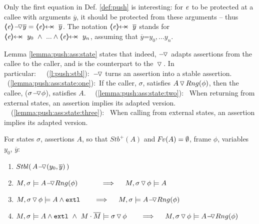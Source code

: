 Only the first equation in  Def.  \ref{def:push}  is interesting: for $\re$ to be {protected at  a} callee with arguments $\overline y$, it should be protected from   %
these arguments -- thus
  $\PushAS y {\inside \re} = \protectedFrom {\re} {\overline {y}}$. 
The notation $\protectedFrom {\re} {\overline {y}}$   stands for $\protectedFrom \re {y_0}\  \wedge\  ...  \wedge \protectedFrom \re {y_n}$, assuming that $\overline y$=${y_0, ... y_n}$.

Lemma \ref{lemma:push:ass:state}  states that   
indeed, $\pushSymbolInText$ adapts assertions from the callee to the caller, and is the counterpart to the  
$\pushSymbol$.
{In particular:\ \ 
 \ (\ref{l:push:stbl}):\    $\pushSymbolInText$ turns an assertion into a stable assertion.
\ (\ref{lemma:push:ass:state:one}):\ If the caller,   $\sigma$,  satisfies  $\PushSLong  {Rng(\phi)} {A}$, then  the callee,   ($\PushASLong {\phi} {\sigma}$), satisfies $A$.
\ \ (\ref{lemma:push:ass:state:two}): \ When returning from external states,  an assertion implies its adapted version.
 \ \ (\ref{lemma:push:ass:state:three}): \ When calling from external states, an assertion implies its adapted version. %
}
  

{
\begin{lemma} 
\label{lemma:push:ass:state}
For  states  $\sigma$, assertions $A$, %
so that $Stb^+(A)$ and $\fv(A)=\emptyset$,  %
frame $\phi$,  variables $y_0$, $\overline y$: %

\begin{enumerate}
 \item
\label{l:push:stbl}
$\Stable{\,  \PushASLong {(y_0,\overline y)} A\, }$
\item
 \label{lemma:push:ass:state:one}
$M, \sigma \models \PushASLong  {Rng(\phi)} {A}\ \  \ \ \ \ \  \ \ \    \Longrightarrow  \ \ \ \ M,  \PushSLong {\phi} {\sigma}   \models A$
\item
 \label{lemma:push:ass:state:two}
$M,  \PushSLong {\phi} {\sigma}   \models  A  \wedge \extThis    \ \  \ \ \  \  \Longrightarrow  \ \ \ \ M, \sigma \models \PushASLong  {Rng(\phi)} {A}$
 \item
 \label{lemma:push:ass:state:three}
$M, \sigma  \models  A  \wedge \extThis  \ \wedge \ M\cdot\Mtwo \models \PushSLong {\phi} {\sigma}   \ \  \ \ \  \  \Longrightarrow  \ \ \ \ M, \PushSLong {\phi} {\sigma} \models \PushASLong  {Rng(\phi)} {A}$
\end{enumerate}
\end{lemma}
}

